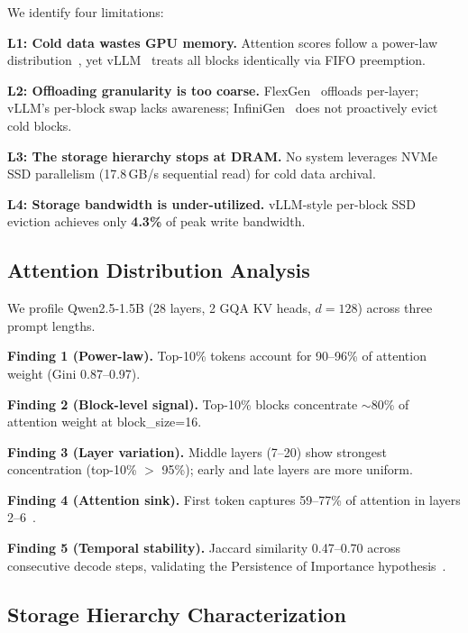 \documentclass[conference]{IEEEtran}
\begin{document}
We identify four limitations:

\textbf{L1: Cold data wastes GPU memory.} Attention scores follow a power-law distribution~\cite{h2o,scissorhands}, yet vLLM~\cite{vllm} treats all blocks identically via FIFO preemption.

\textbf{L2: Offloading granularity is too coarse.} FlexGen~\cite{flexgen} offloads per-layer; vLLM's per-block swap lacks awareness; InfiniGen~\cite{infinigen} does not proactively evict cold blocks.

\textbf{L3: The storage hierarchy stops at DRAM.} No system leverages NVMe SSD parallelism (17.8\,GB/s sequential read) for cold data archival.

\textbf{L4: Storage bandwidth is under-utilized.} vLLM-style per-block SSD eviction achieves only \textbf{4.3\%} of peak write bandwidth.

\subsection{Attention Distribution Analysis}

We profile Qwen2.5-1.5B (28 layers, 2 GQA KV heads, $d{=}128$) across three prompt lengths.


\textbf{Finding 1 (Power-law).} Top-10\% tokens account for 90--96\% of attention weight (Gini 0.87--0.97).

\textbf{Finding 2 (Block-level signal).} Top-10\% blocks concentrate ${\sim}$80\% of attention weight at block\_size=16.

\textbf{Finding 3 (Layer variation).} Middle layers (7--20) show strongest concentration (top-10\% $>$ 95\%); early and late layers are more uniform.

\textbf{Finding 4 (Attention sink).} First token captures 59--77\% of attention in layers 2--6~\cite{streamingllm}.

\textbf{Finding 5 (Temporal stability).} Jaccard similarity 0.47--0.70 across consecutive decode steps, validating the Persistence of Importance hypothesis~\cite{scissorhands}.

\subsection{Storage Hierarchy Characterization}
\label{sec:storage-char}

\end{document}
